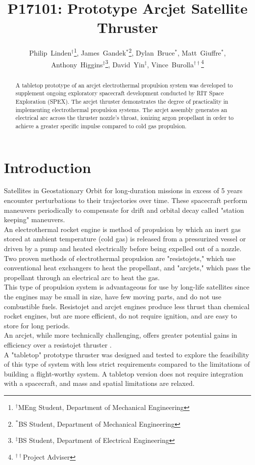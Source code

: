 \documentclass[journal]{IEEEtran}
\title{P17101: Prototype Arcjet Satellite Thruster}
\author{
  Philip~Linden$^{\dagger}$\thanks{$^{\dagger}$MEng Student, Department of Mechanical Engineering},
  James~Gandek$^{*}$\thanks{$^{*}$BS Student, Department of Mechanical Engineering},
  Dylan~Bruce$^{*}$,
  Matt~Giuffre$^{*}$,
  Anthony~Higgins$^{\ddagger}$\thanks{$^{\ddagger}$BS Student, Department of Electrical Engineering},
  David~Yin$^{\ddagger}$,
  Vince~Burolla$^{\dagger\dagger}$\thanks{$^{\dagger\dagger}$Project Adviser}
}
\begin{document}
\maketitle


\begin{abstract}
A tabletop prototype of an arcjet electrothermal propulsion system was developed to supplement ongoing exploratory spacecraft development conducted by RIT Space Exploration (SPEX). The arcjet thruster demonstrates the degree of practicality in implementing electrothermal propulsion systems. The arcjet assembly generates an electrical arc across the thruster nozzle's throat, ionizing argon propellant in order to achieve a greater specific impulse compared to cold gas propulsion.
\end{abstract}
\section{Introduction}
Satellites in Geostationary Orbit for long-duration missions in excess of 5 years encounter perturbations to their trajectories over time. These spacecraft perform maneuvers periodically to compensate for drift and orbital decay called "station keeping" maneuvers.\\
An electrothermal rocket engine is method of propulsion by which an inert gas stored at ambient temperature (cold gas) is released from a pressurized vessel or driven by a pump and heated electrically before being expelled out of a nozzle. Two proven methods of electrothermal propulsion are "resistojets," which use conventional heat exchangers to heat the propellant, and "arcjets," which pass the propellant through an electrical arc to heat the gas.\\
This type of propulsion system is advantageous for use by long-life satellites since the engines may be small in size, have few moving parts, and do not use combustible fuels. Resistojet and arcjet engines produce less thrust than chemical rocket engines, but are more efficient, do not require ignition, and are easy to store for long periods.\\
An arcjet, while more technically challenging, offers greater potential gains in efficiency over a resistojet thruster \cite{sourceone}.\\
A "tabletop" prototype thruster was designed and tested to explore the feasibility of this type of system with less strict requirements compared to the limitations of building a flight-worthy system. A tabletop version does not require integration with a spacecraft, and mass and spatial limitations are relaxed.
\end{document}
